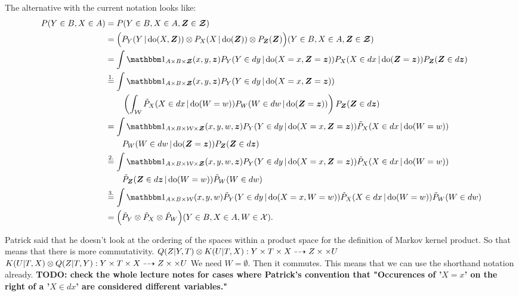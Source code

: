 The alternative with the current notation looks like:
\begin{align*}
  P(Y \in B, X \in A)
  &= P(Y \in B, X \in A, \B{Z} \in \BC{Z}) \\
  &= \Big(P_Y(Y \given \doit(X,\B{Z})) \otimes P_X(X \given \doit(\B{Z})) \otimes P_{\B{Z}}(\B{Z})\Big)(Y \in B, X \in A, \B{Z} \in \BC{Z}) \\
  &= \int \I_{A\times B \times \BC{Z}}(x,y,\B{z}) P_Y(Y \in dy \given \doit(X=x,\B{Z}=\B{z})) P_X(X \in dx \given \doit(\B{Z}=\B{z})) P_{\B{Z}}(\B{Z} \in d\B{z}) \\
  &\stackrel{1.}{=} \int \I_{A\times B \times \BC{Z}}(x,y,\B{z}) P_Y(Y \in dy \given \doit(X=x,\B{Z}=\B{z})) \\
   & \qquad \left( \int_{\C{W}} \tilde{P}_X(X \in dx \given \doit(W=w)) P_W(W \in dw \given \doit(\B{Z}=\B{z})) \right) P_{\B{Z}}(\B{Z} \in d\B{z}) \\
  &= \int \I_{A\times B \times \C{W} \times \BC{Z}}(x,y,w,\B{z}) P_Y(Y \in dy \given \doit(X=x,\B{Z}=\B{z})) \tilde{P}_X(X \in dx \given \doit(W=w)) \\
   & \qquad P_W(W \in dw \given \doit(\B{Z}=\B{z})) P_{\B{Z}}(\B{Z} \in d\B{z}) \\
  &\stackrel{2.}{=} \int \I_{A\times B \times \C{W} \times \BC{Z}}(x,y,w,\B{z}) P_Y(Y \in dy \given \doit(X=x,\B{Z}=\B{z})) \tilde{P}_X(X \in dx \given \doit(W=w)) \\
   & \qquad \tilde{P}_{\B{Z}}(\B{Z} \in d\B{z} \given \doit(W=w)) \tilde{P}_W(W \in dw) \\
  &\stackrel{3.}{=} \int \I_{A\times B \times \C{W}}(x,y,w) \tilde{P}_Y(Y \in dy \given \doit(X=x,W=w)) \tilde{P}_X(X \in dx \given \doit(W=w)) \tilde{P}_W(W \in dw) \\
  &= \Big(\tilde{P}_Y \otimes \tilde{P}_X \otimes \tilde{P}_W\Big)(Y \in B, X \in A, W \in \C{X}).
\end{align*}

Patrick said that he doesn't look at the ordering of the spaces within a product space for the definition of Markov kernel product. So that means that there is more commutativity. 
$Q(Z|Y,T) \otimes K(U|T,X) : Y \times T \times X \dashrightarrow Z \times \times U$
$K(U|T,X) \otimes Q(Z|T,Y) : Y \times T \times X \dashrightarrow Z \times \times U$
We need $W = \emptyset$. Then it commutes.
This means that we can use the shorthand notation already.
\textbf{TODO: check the whole lecture notes for cases where Patrick's convention that "Occurences of '$X=x$' on the right of a '$X \in dx$' are considered different variables."}

